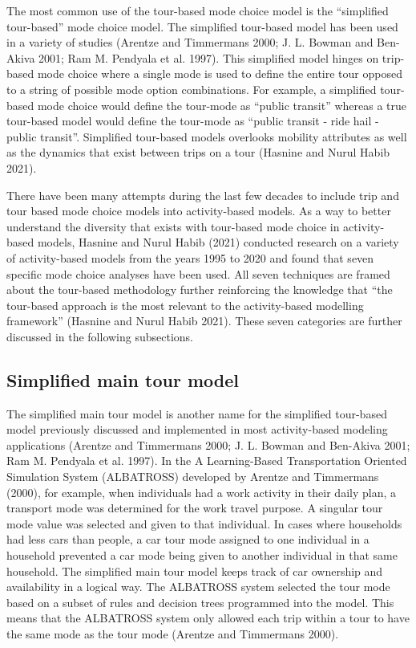 \documentclass[12pt, oneside, openright]{byuthesis}
\begin{document}
The most common use of the tour-based mode choice model is the ``simplified tour-based'' mode choice model. The simplified tour-based model has been used in a variety of studies (Arentze and Timmermans 2000; J. L. Bowman and Ben-Akiva 2001; Ram M. Pendyala et al. 1997). This simplified model hinges on trip-based mode choice where a single mode is used to define the entire tour opposed to a string of possible mode option combinations. For example, a simplified tour-based mode choice would define the tour-mode as ``public transit'' whereas a true tour-based model would define the tour-mode as ``public transit - ride hail - public transit''. Simplified tour-based models overlooks mobility attributes as well as the dynamics that exist between trips on a tour (Hasnine and Nurul Habib 2021).

There have been many attempts during the last few decades to include trip and tour based mode choice models into activity-based models. As a way to better understand the diversity that exists with tour-based mode choice in activity-based models, Hasnine and Nurul Habib (2021) conducted research on a variety of activity-based models from the years 1995 to 2020 and found that seven specific mode choice analyses have been used. All seven techniques are framed about the tour-based methodology further reinforcing the knowledge that ``the tour-based approach is the most relevant to the activity-based modelling framework'' (Hasnine and Nurul Habib 2021). These seven categories are further discussed in the following subsections.

\hypertarget{lit31}{%
\subsection{Simplified main tour model}\label{lit31}}

The simplified main tour model is another name for the simplified tour-based model previously discussed and implemented in most activity-based modeling applications (Arentze and Timmermans 2000; J. L. Bowman and Ben-Akiva 2001; Ram M. Pendyala et al. 1997). In the A Learning-Based Transportation Oriented Simulation System (ALBATROSS) developed by Arentze and Timmermans (2000), for example, when individuals had a work activity in their daily plan, a transport mode was determined for the work travel purpose. A singular tour mode value was selected and given to that individual. In cases where households had less cars than people, a car tour mode assigned to one individual in a household prevented a car mode being given to another individual in that same household. The simplified main tour model keeps track of car ownership and availability in a logical way. The ALBATROSS system selected the tour mode based on a subset of rules and decision trees programmed into the model. This means that the ALBATROSS system only allowed each trip within a tour to have the same mode as the tour mode (Arentze and Timmermans 2000).
\end{document}
